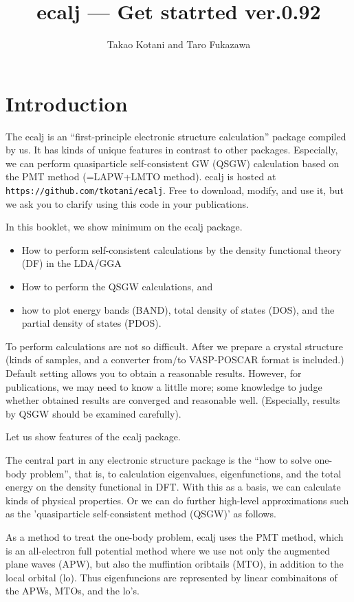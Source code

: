 \documentclass[a4paper,10pt,epsf,fleqn]{article}
\author{Takao Kotani and Taro Fukazawa}
\title{ecalj --- Get statrted ver.0.92}
\begin{document}
\maketitle
\tableofcontents
\newpage
\section{Introduction}
The ecalj is an ``first-principle electronic structure calculation''
package compiled by us. It has kinds of unique features in contrast to other packages.
Especially, we can perform quasiparticle self-consistent GW (QSGW)
calculation based on the PMT method (=LAPW+LMTO method).
ecalj is hosted at \verb+https://github.com/tkotani/ecalj+.
Free to download, modify, and use it, but we ask you to clarify 
using this code in your publications.

In this booklet, we show minimum on the ecalj package.
\begin{itemize}
\item
How to perform self-consistent calculations by the density functional
theory (DF) in the LDA/GGA 
\item
How to perform the QSGW calculations, and\\ 
\item
how to plot energy bands (BAND), total density of states
(DOS), and the partial density of states (PDOS).
\end{itemize}

To perform calculations are not so difficult.
After we prepare a crystal structure 
(kinds of samples, and a converter from/to VASP-POSCAR format is included.)
Default setting allows you to obtain a reasonable results.
However, for publications, we may need to know a littlle more;
some knowledge to judge whether obtained results 
are converged and reasonable well. 
(Especially, results by QSGW should be examined carefully). 

Let us show features of the ecalj package.

The central part in any electronic structure package is the
``how to solve one-body problem'', that is,
to calculation eigenvalues, eigenfunctions, and the total energy
on the density functional in DFT.
With this as a basis, we can calculate kinds of physical properties.
Or we can do further high-level approximations
such as the 'quasiparticle self-consistent method (QSGW)' as follows.

As a method to treat the one-body problem, ecalj uses the PMT method, which is an
all-electron full potential method where we use not only the
augmented plane waves (APW), but also the muffintion oribtails (MTO),
in addition to the local orbital (lo).
Thus eigenfuncions are represented by linear combinaitons of the
APWs, MTOs, and the lo's.
\end{document}
